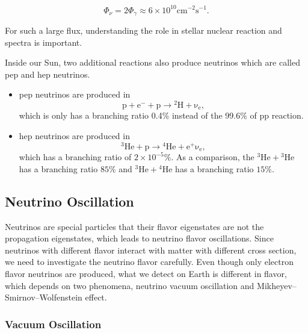 \documentclass[%
 aip,
 jmp,%
 amsmath,amssymb,
 reprint,%
]{revtex4-1}
\begin{document}
\begin{equation}
\Phi_\nu = 2 \Phi_\gamma \approx 6\times 10^{10} \mathrm{cm^{-2}s^{-1}}.
\end{equation}


For such a large flux, understanding the role in stellar nuclear reaction and spectra is important.

Inside our Sun, two additional reactions also produce neutrinos which are called pep and hep neutrinos.

\begin{itemize}
\item pep neutrinos are produced in 
\begin{equation}
\mathrm{p + e^- + p \to {}^2H +\nu_e},
\end{equation}
which is only has a branching ratio 0.4\% instead of the 99.6\% of pp reaction.
\item hep neutrinos are produced in
\begin{equation}
\mathrm{ {}^3He + p \to {}^4He + e^+ \nu_e },
\end{equation}
which has a branching ratio of $2\times 10^{-5}\%$. As a comparison, the $\mathrm{{}^3He + {}^3He}$ has a branching ratio $85\%$ and $\mathrm{{}^3He + {}^4He}$ has a branching ratio $15\%$.

\end{itemize}













\subsection{Neutrino Oscillation}


Neutrinos are special particles that their flavor eigenstates are not the propagation eigenstates, which leads to neutrino flavor oscillations. Since neutrinos with different flavor interact with matter with different cross section, we need to investigate the neutrino flavor carefully. Even though only electron flavor neutrinos are produced, what we detect on Earth is different in flavor, which depends on two phenomena, neutrino vacuum oscillation and Mikheyev–Smirnov–Wolfenstein effect.

\subsubsection{Vacuum Oscillation}
\end{document}
